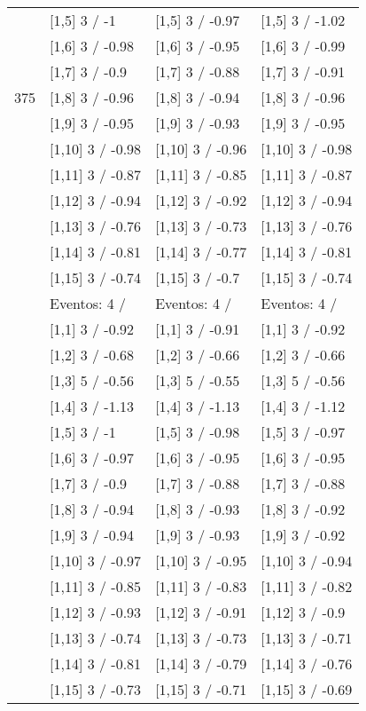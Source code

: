 \begin{table}
\begin{tabular}[t]{llll}
 & {}[1,5] 3  / -1 & {}[1,5] 3  / -0.97 & {}[1,5] 3  / -1.02\\
 & {}[1,6] 3  / -0.98 & {}[1,6] 3  / -0.95 & {}[1,6] 3  / -0.99\\
 & {}[1,7] 3  / -0.9 & {}[1,7] 3  / -0.88 & {}[1,7] 3  / -0.91\\
375 & {}[1,8] 3  / -0.96 & {}[1,8] 3  / -0.94 & {}[1,8] 3  / -0.96\\
\addlinespace
 & {}[1,9] 3  / -0.95 & {}[1,9] 3  / -0.93 & {}[1,9] 3  / -0.95\\
 & {}[1,10] 3  / -0.98 & {}[1,10] 3  / -0.96 & {}[1,10] 3  / -0.98\\
 & {}[1,11] 3  / -0.87 & {}[1,11] 3  / -0.85 & {}[1,11] 3  / -0.87\\
 & {}[1,12] 3  / -0.94 & {}[1,12] 3  / -0.92 & {}[1,12] 3  / -0.94\\
 & {}[1,13] 3  / -0.76 & {}[1,13] 3  / -0.73 & {}[1,13] 3  / -0.76\\
\addlinespace
 & {}[1,14] 3  / -0.81 & {}[1,14] 3  / -0.77 & {}[1,14] 3  / -0.81\\
 & {}[1,15] 3  / -0.74 & {}[1,15] 3  / -0.7 & {}[1,15] 3  / -0.74\\
 & Eventos:  4 / & Eventos:  4 / & Eventos:  4 /\\
 & {}[1,1] 3  / -0.92 & {}[1,1] 3  / -0.91 & {}[1,1] 3  / -0.92\\
 & {}[1,2] 3  / -0.68 & {}[1,2] 3  / -0.66 & {}[1,2] 3  / -0.66\\
\addlinespace
 & {}[1,3] 5  / -0.56 & {}[1,3] 5  / -0.55 & {}[1,3] 5  / -0.56\\
 & {}[1,4] 3  / -1.13 & {}[1,4] 3  / -1.13 & {}[1,4] 3  / -1.12\\
 & {}[1,5] 3  / -1 & {}[1,5] 3  / -0.98 & {}[1,5] 3  / -0.97\\
 & {}[1,6] 3  / -0.97 & {}[1,6] 3  / -0.95 & {}[1,6] 3  / -0.95\\
 & {}[1,7] 3  / -0.9 & {}[1,7] 3  / -0.88 & {}[1,7] 3  / -0.88\\
\addlinespace
500 & {}[1,8] 3  / -0.94 & {}[1,8] 3  / -0.93 & {}[1,8] 3  / -0.92\\
 & {}[1,9] 3  / -0.94 & {}[1,9] 3  / -0.93 & {}[1,9] 3  / -0.92\\
 & {}[1,10] 3  / -0.97 & {}[1,10] 3  / -0.95 & {}[1,10] 3  / -0.94\\
 & {}[1,11] 3  / -0.85 & {}[1,11] 3  / -0.83 & {}[1,11] 3  / -0.82\\
 & {}[1,12] 3  / -0.93 & {}[1,12] 3  / -0.91 & {}[1,12] 3  / -0.9\\
\addlinespace
 & {}[1,13] 3  / -0.74 & {}[1,13] 3  / -0.73 & {}[1,13] 3  / -0.71\\
 & {}[1,14] 3  / -0.81 & {}[1,14] 3  / -0.79 & {}[1,14] 3  / -0.76\\
 & {}[1,15] 3  / -0.73 & {}[1,15] 3  / -0.71 & {}[1,15] 3  / -0.69\\
\bottomrule
\end{tabular}
\end{table}
